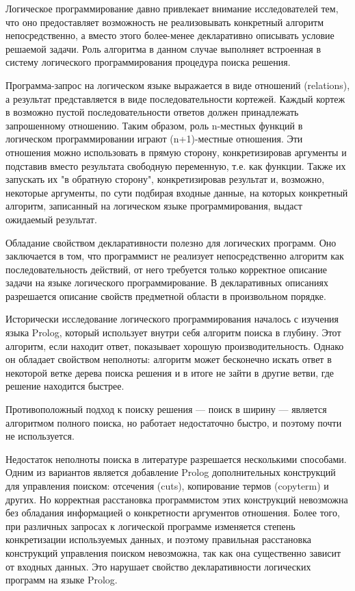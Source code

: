 
{\actuality}
Логическое программирование давно привлекает внимание исследователей тем, что оно предоставляет возможность не реализовывать конкретный алгоритм непосредственно, а вместо этого более-менее декларативно описывать условие решаемой задачи. Роль алгоритма в данном случае выполняет встроенная в систему логического программирования процедура поиска решения.

Программа-запрос на логическом языке выражается в виде отношений (relations), а результат представляется в виде последовательности кортежей.
Каждый кортеж в возможно пустой последовательности ответов должен принадлежать запрошенному отношению. Таким образом, роль n-местных функций в логическом программировании играют (n+1)-местные отношения. Эти отношения можно использовать в прямую сторону, конкретизировав аргументы и подставив вместо результата свободную переменную, т.е. как функции. Также их  запускать их "в обратную сторону", конкретизировав результат и, возможно, некоторые аргументы, по сути подбирая входные данные, на которых конкретный алгоритм, записанный на логическом языке программирования, выдаст ожидаемый результат.

Обладание свойством декларативности полезно для логических программ. Оно заключается в том, что программист не реализует непосредственно алгоритм как последовательность действий, от него требуется только корректное описание задачи на языке логического программирование. В декларативных описаниях разрешается описание свойств предметной области в произвольном порядке.

Исторически исследование логического программирования началось с изучения языка Prolog, который использует внутри себя  алгоритм поиска в глубину. Этот алгоритм, если находит ответ, показывает хорошую производительность. Однако он обладает свойством неполноты: алгоритм может бесконечно искать ответ в некоторой ветке дерева поиска решения и в итоге не зайти в другие ветви, где решение находится быстрее.

Противоположный подход к поиску решения --- поиск в ширину --- является алгоритмом полного поиска, но работает недостаточно быстро, и поэтому почти не используется.

Недостаток неполноты поиска в литературе разрешается несколькими способами. Одним из вариантов является добавление Prolog дополнительных конструкций для управления поиском: отсечения (cuts), копирование термов (copyterm) и других. Но корректная расстановка программистом этих конструкций невозможна без обладания информацией о конкретности аргументов отношения. Более того, при различных запросах к логической программе изменяется степень конкретизации используемых данных, и поэтому правильная расстановка конструкций управления поиском невозможна, так как она существенно зависит от входных данных. Это нарушает свойство декларативности логических программ на языке Prolog.

